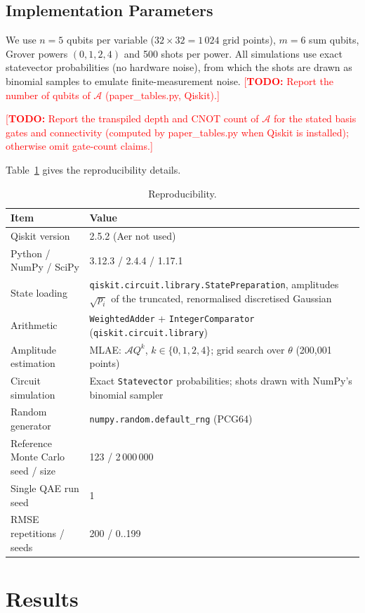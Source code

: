 \documentclass[pdflatex,sn-mathphys-num]{sn-jnl}%
\newcommand{\todo}[1]{\textcolor{red}{[\textbf{TODO:} #1]}}
\theoremstyle{thmstyleone}%
\theoremstyle{thmstyletwo}%
\theoremstyle{thmstylethree}%
\begin{document}
\subsection{Implementation Parameters}

We use $n=5$ qubits per variable ($32\times32=1\,024$ grid points), $m=6$ sum qubits, Grover powers $(0,1,2,4)$ and 500 shots per power. All simulations use exact statevector probabilities (no hardware noise), from which the shots are drawn as binomial samples to emulate finite-measurement noise. \todo{Report the number of qubits of $\mathcal A$ (paper\_tables.py, Qiskit).}

\todo{Report the transpiled depth and CNOT count of $\mathcal A$ for the stated basis gates and connectivity (computed by paper\_tables.py when Qiskit is installed); otherwise omit gate-count claims.}

Table~\ref{reproducibility} gives the reproducibility details.
\begin{table}[h!]
\centering
\caption{Reproducibility.}\label{reproducibility}
\renewcommand{\arraystretch}{1.2}
\begin{tabularx}{\textwidth}{lX}
\toprule
\textbf{Item} & \textbf{Value} \\ \midrule
Qiskit version & 2.5.2 (Aer not used) \\
Python / NumPy / SciPy & 3.12.3 / 2.4.4 / 1.17.1 \\
State loading & \texttt{qiskit.circuit.library.StatePreparation}, amplitudes $\sqrt{p_i}$ of the truncated, renormalised discretised Gaussian \\
Arithmetic & \texttt{WeightedAdder} + \texttt{IntegerComparator} (\texttt{qiskit.circuit.library}) \\
Amplitude estimation & MLAE: $\mathcal{A}Q^k$, $k\in\{0,1,2,4\}$; grid search over $\theta$ (200,001 points) \\
Circuit simulation & Exact \texttt{Statevector} probabilities; shots drawn with NumPy's binomial sampler \\
Random generator & \texttt{numpy.random.default\_rng} (PCG64) \\
Reference Monte Carlo seed / size & 123 / 2\,000\,000 \\
Single QAE run seed & 1 \\
RMSE repetitions / seeds & 200 / 0..199 \\
\bottomrule
\end{tabularx}
\end{table}

\section{Results}\label{sec3}
\end{document}
